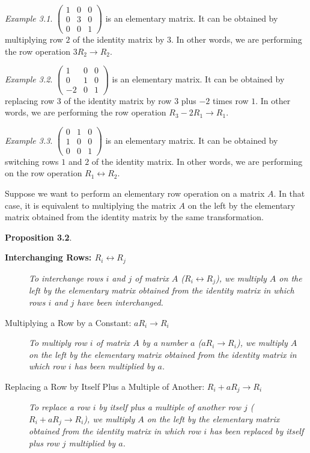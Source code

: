 \documentclass[
  letterpaper,
  DIV=11,
  numbers=noendperiod]{scrartcl}
\theoremstyle{remark}
\begin{document}
\emph{Example 3.1}.
\(\left(\begin{array}{ccc}1 & 0 & 0 \\ 0 & 3 & 0 \\ 0 & 0 & 1\end{array}\right)\)
is an elementary matrix. It can be obtained by multiplying row \(2\) of
the identity matrix by \(3\). In other words, we are performing the row
operation \(3R_{2}\rightarrow R_{2}\).

\emph{Example 3.2}.
\(\left(\begin{array}{ccc}1 & 0 & 0 \\ 0 & 1 & 0 \\ -2 & 0 & 1\end{array}\right)\)
is an elementary matrix. It can be obtained by replacing row \(3\) of
the identity matrix by row \(3\) plus \(-2\) times row \(1\). In other
words, we are performing the row operation
\(R_{3}-2 R_{1}\rightarrow R_{1}\).

\emph{Example 3.3}.
\(\left(\begin{array}{ccc}0 & 1 & 0 \\ 1 & 0 & 0 \\ 0 & 0 & 1\end{array}\right)\)
is an elementary matrix. It can be obtained by switching rows \(1\) and
\(2\) of the identity matrix. In other words, we are performing on the
row operation \(R_{1}\leftrightarrow R_{2}\).

Suppose we want to perform an elementary row operation on a matrix
\(A\). In that case, it is equivalent to multiplying the matrix \(A\) on
the left by the elementary matrix obtained from the identity matrix by
the same transformation.

\textbf{Proposition 3.2}.

\begin{description}
\item[\textbf{Interchanging Rows: \(R_{i}\leftrightarrow R_{j}\)}]
\emph{To interchange rows \(i\) and \(j\) of matrix \(A\)
(\(R_{i}\leftrightarrow R_{j}\)), we multiply \(A\) on the left by the
elementary matrix obtained from the identity matrix in which rows \(i\)
and \(j\) have been interchanged.}
\item[Multiplying a Row by a Constant: \(aR_{i}\rightarrow R_{i}\)]
\emph{To multiply row \(i\) of matrix \(A\) by a number \(a\)
(\(aR_{i}\rightarrow R_{i}\)), we multiply \(A\) on the left by the
elementary matrix obtained from the identity matrix in which row \(i\)
has been multiplied by \(a\).}
\item[Replacing a Row by Itself Plus a Multiple of Another:
\(R_{i}+aR_{j}\rightarrow R_{i}\)]
\emph{To replace a row \(i\) by itself plus a multiple of another row
\(j\) (\(R_{i}+aR_{j}\rightarrow R_{i}\)), we multiply \(A\) on the left
by the elementary matrix obtained from the identity matrix in which row
\(i\) has been replaced by itself plus row \(j\) multiplied by \(a\).}
\end{description}
\end{document}
